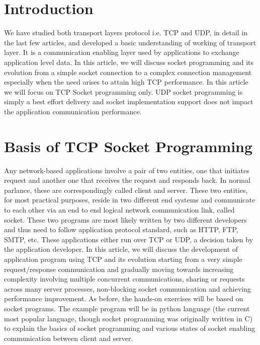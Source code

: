 \begin{multicols}{2}


\section{Introduction}
 
\vspace{-.2cm}
 
 We have studied both transport layers protocol i.e. TCP\cite{art1-key01} and UDP\cite{art1-key02}, in detail in the last few articles, and developed a basic understanding of working of transport layer. It is a communication enabling layer used by applications to exchange application level data. In this article, we will discuss socket programming and its evolution from a simple socket connection to a complex connection management especially when the need arises to attain high TCP performance.  In this article we will focus on TCP Socket programming only. UDP socket programming is simply a best effort delivery and socket implementation support does not impact the application communication performance.

\vspace{-.3cm}

\section{Basis of TCP Socket Programming}

\vspace{-.2cm}

Any network-based applications involve a pair of two entities, one that initiates request and another one that receives the request and responds back. In normal parlance, these are correspondingly called client and server. These two entities, for most practical purposes, reside in two different end systems and communicate to each other via an end to end logical network communication link, called socket. These two programs are most likely written by two different developers and thus need to follow application protocol standard, such as HTTP, FTP, SMTP, etc.  These applications either run over TCP or UDP, a decision taken by the application developer. In this article, we will discuss the development of application program using TCP and its evolution starting from a very simple request/response communication and gradually moving towards increasing complexity involving multiple concurrent communications, sharing or requests across many server processes, non-blocking socket communication and achieving performance improvement. As before, the hands-on exercises will be based on socket programs.  The example program will be in python language (the current most popular language, though socket programming was originally written in C) to explain the basics of socket programming and various states of socket enabling communication between client and server.


\end{multicols}
